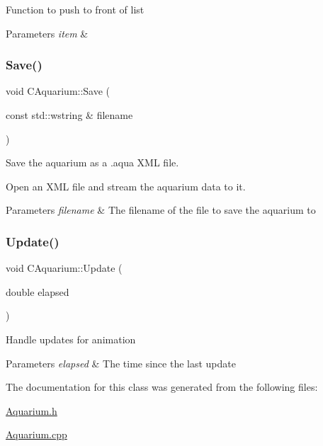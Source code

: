 Function to push to front of list 
\begin{DoxyParams}{Parameters}
{\em item} & \\
\hline
\end{DoxyParams}
\mbox{\label{class_c_aquarium_acace2b3a8c1ed29011d83ac8231c66d0}} 
\subsubsection{\texorpdfstring{Save()}{Save()}}
{\footnotesize\ttfamily void C\+Aquarium\+::\+Save (\begin{DoxyParamCaption}\item[{const std\+::wstring \&}]{filename }\end{DoxyParamCaption})}

Save the aquarium as a .aqua X\+ML file.

Open an X\+ML file and stream the aquarium data to it.


\begin{DoxyParams}{Parameters}
{\em filename} & The filename of the file to save the aquarium to \\
\hline
\end{DoxyParams}
\mbox{\label{class_c_aquarium_aeffc772356405adc8b79beba77c25d0f}} 
\subsubsection{\texorpdfstring{Update()}{Update()}}
{\footnotesize\ttfamily void C\+Aquarium\+::\+Update (\begin{DoxyParamCaption}\item[{double}]{elapsed }\end{DoxyParamCaption})}

Handle updates for animation 
\begin{DoxyParams}{Parameters}
{\em elapsed} & The time since the last update \\
\hline
\end{DoxyParams}


The documentation for this class was generated from the following files\+:\begin{DoxyCompactItemize}
\item 
\mbox{\hyperlink{_aquarium_8h}{Aquarium.\+h}}\item 
\mbox{\hyperlink{_aquarium_8cpp}{Aquarium.\+cpp}}\end{DoxyCompactItemize}
